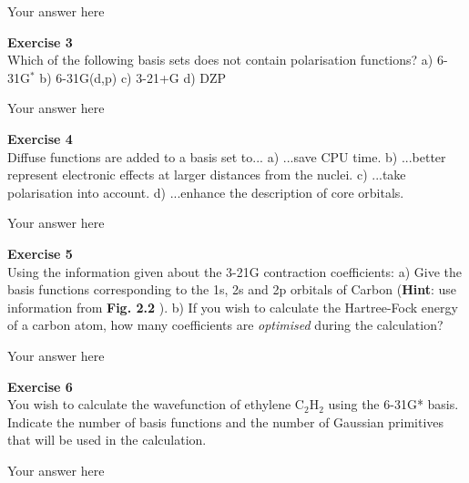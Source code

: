 \documentclass{article}
\begin{document}
Your answer here

\begin{mdframed}
\textbf{Exercise 3}\\
Which of the following basis sets does not contain polarisation functions?\newline
a) 6-31G$^\ast$\newline
b) 6-31G(d,p)\newline
c) 3-21+G\newline
d) DZP
\end{mdframed}

Your answer here

\begin{mdframed}
\textbf{Exercise 4}\\
Diffuse functions are added to a basis set to...\newline
a) ...save CPU time.\newline
b) ...better represent electronic effects at larger distances from the nuclei.\newline
c) ...take polarisation into account.\newline
d) ...enhance the description of core orbitals.
\end{mdframed}

Your answer here

\begin{mdframed}
\textbf{Exercise 5}\\
Using the information given about the 3-21G contraction coefficients:\newline
a) Give the basis functions corresponding to the 1s, 2s and 2p orbitals of Carbon (\textbf{Hint}: use information from \textbf{Fig. 2.2} ).\newline
b) If you wish to calculate the Hartree-Fock energy of a carbon atom,
how many coefficients are \textit{optimised} during the calculation?
\end{mdframed}

Your answer here

\begin{mdframed}
\textbf{Exercise 6}\\
You wish to calculate the wavefunction of ethylene C$_2$H$_2$ using the 6-31G* basis. \newline
Indicate the number of basis functions and the number of Gaussian primitives that will be used in the calculation.
\end{mdframed}

Your answer here
\end{document}
